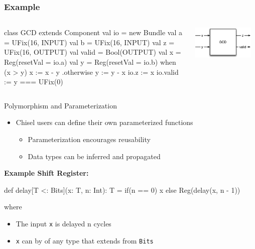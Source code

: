 \documentclass[xcolor=pdflatex,dvipsnames,table]{beamer}
\begin{document}
\begin{frame}[fragile]
\frametitle{Example}
\begin{columns}


\begin{footnotesize}
\begin{scala}
class GCD extends Component {
  val io = new Bundle {
    val a     = UFix(16, INPUT)
    val b     = UFix(16, INPUT)
    val z     = UFix(16, OUTPUT)
    val valid = Bool(OUTPUT) }
  val x = Reg(resetVal = io.a)
  val y = Reg(resetVal = io.b)
  when (x > y) {
    x := x - y
  } .otherwise {
    y := y - x
  }
  io.z     := x
  io.valid := y === UFix(0)
}
\end{scala}
\end{footnotesize}


\begin{center}
\includegraphics[width=0.9\textwidth]{figs/gcd.pdf} 
\end{center}

\end{columns}
\end{frame}

\begin{frame}[fragile]{Polymorphism and Parameterization}
\begin{itemize}
\item Chisel users can define their own parameterized functions
\begin{itemize}
\item Parameterization encourages reusability
\item Data types can be inferred and propagated
\end{itemize}
\end{itemize}

\textbf{Example Shift Register:}
\begin{scala}
def delay[T <: Bits](x: T, n: Int): T = 
  if(n == 0) x else Reg(delay(x, n - 1))
\end{scala}
where
\begin{itemize}
\item The input \verb+x+ is delayed n cycles
\item \verb+x+ can by of any type that extends from \verb+Bits+
\end{itemize}

\end{frame}
\end{document}
